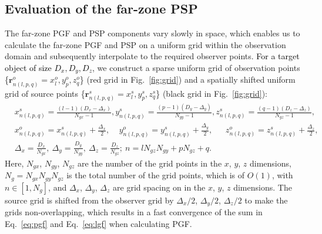 \documentclass{article}
\begin{document}
\subsection{Evaluation of the far-zone PSP} \label{ssec:3_far_field}
The far-zone PGF and PSP components vary slowly in space, which enables us to calculate the far-zone PGF and PSP on a uniform grid within the observation domain and subsequently interpolate to the required observer points. \textcolor{black}{For a target object of size $D_x,D_y,D_z$}, we construct a sparse uniform grid of observation points \{$\mathbf{r}_{n(l,p,q)}^o={x_{l}^o, y_{p}^o, z_{q}^o}$\} (red grid in Fig.~\ref{fig:grid}) and a spatially shifted uniform grid of source points \{$\mathbf{r}_{n(l,p,q)}^s={x_{l}^s, y_{p}^s, z_{q}^s}$\} (black grid in Fig.~\ref{fig:grid}):
\begin{subequations}\label{eq:grid}
    \begin{align}
        &x_{n(l,p,q)}^s = \frac{(l-1)(D_x-\Delta_x)}{N_{gx}-1}, y_{n(l,p,q)}^s = \frac{(p-1)(D_y-\Delta_y)}{N_{gy}-1}, z_{n(l,p,q)}^s = \frac{(q-1)(D_z-\Delta_z)}{N_{gz}-1}, \label{eq:grida} \\ 
        &x_{n(l,p,q)}^o = x_{n(l,p,q)}^s + \frac{\Delta_x}{2},\ \ \ \ \  y_{n(l,p,q)}^o = y_{n(l,p,q)}^s + \frac{\Delta_y}{2},\ \ \ \ \ \ \ z_{n(l,p,q)}^o = z_{n(l,p,q)}^s + \frac{\Delta_z}{2}, \label{eq:gridb} \\
        &\Delta_x = \frac{D_x}{N_{gx}},\ \Delta_y = \frac{D_y}{N_{gy}},\ \Delta_z = \frac{D_z}{N_{gz}};\ n= l N_{gz}N_{gy} + p N_{gz} + q. \label{eq:gridc}
    \end{align}
\end{subequations}
Here, $N_{gx}$, $N_{gy}$, $N_{gz}$ are the number of the grid points in the $x$, $y$, $z$ dimensions, $N_g=N_{gx}N_{gy}N_{gz}$ is the total number of the grid points, which is of  $O(1)$,  with $n\in [1, N_g]$, and $\Delta_x$, $\Delta_y$, $\Delta_z$ are grid spacing on  in the $x$, $y$, $z$ dimensions. The source grid is shifted from the observer grid by $\Delta_x/2$, $\Delta_y/2$, $\Delta_z/2$ to make the grids non-overlapping, which results in a fast convergence of the sum in Eq.~\eqref{eq:pgf} and Eq.~\eqref{eq:lgf} when calculating PGF. 
\end{document}
